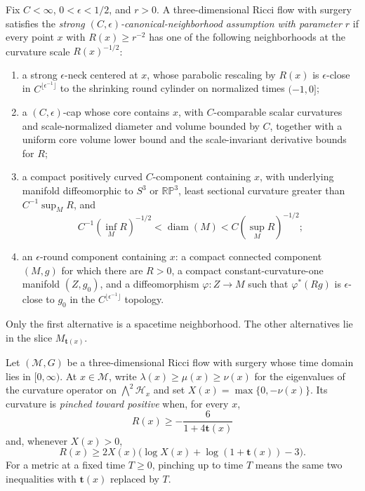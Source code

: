\begin{definition}
\label{def:strong-canonical-neighborhood-control}
\notready
Fix $C<\infty$, $0<\epsilon<1/2$, and $r>0$.  A three-dimensional Ricci
flow with surgery satisfies the \emph{strong
$(C,\epsilon)$-canonical-neighborhood assumption with parameter $r$} if
every point $x$ with $R(x)\ge r^{-2}$ has one of the following
neighborhoods at the curvature scale $R(x)^{-1/2}$:
\begin{enumerate}
\item a strong $\epsilon$-neck centered at $x$, whose parabolic rescaling by
      $R(x)$ is $\epsilon$-close in
      $C^{\lfloor\epsilon^{-1}\rfloor}$ to the shrinking round cylinder on
      normalized times $(-1,0]$;
\item a $(C,\epsilon)$-cap whose core contains $x$, with $C$-comparable
      scalar curvatures and scale-normalized diameter and volume bounded by
      $C$, together with a uniform core volume lower bound and the
      scale-invariant derivative bounds for $R$;
\item a compact positively curved $C$-component containing $x$, with
      underlying manifold diffeomorphic to $S^3$ or $\mathbb{RP}^3$,
      least sectional curvature greater than $C^{-1}\sup_M R$, and
      \[
       C^{-1}(\inf_M R)^{-1/2}<\operatorname{diam}(M)
       <C(\sup_M R)^{-1/2};
      \]
\item an $\epsilon$-round component containing $x$: a compact connected
      component $(M,g)$ for which there are $R>0$, a compact
      constant-curvature-one manifold $(Z,g_0)$, and a diffeomorphism
      $\varphi:Z\to M$ such that $\varphi^*(Rg)$ is $\epsilon$-close to $g_0$
      in the $C^{\lfloor\epsilon^{-1}\rfloor}$ topology.
\end{enumerate}
Only the first alternative is a spacetime neighborhood.  The other
alternatives lie in the slice $M_{\mathbf t(x)}$.
\end{definition}

\begin{definition}
\label{def:curvature-pinched-toward-positive}
\notready
Let $(\mathcal M,G)$ be a three-dimensional Ricci flow with surgery whose
time domain lies in $[0,\infty)$.  At $x\in\mathcal M$, write
$\lambda(x)\ge\mu(x)\ge\nu(x)$ for the eigenvalues of the curvature
operator on $\bigwedge^2\mathcal H_x$ and set
$X(x)=\max\{0,-\nu(x)\}$.  Its curvature is \emph{pinched toward positive}
when, for every $x$,
\[
 R(x)\ge-\frac{6}{1+4\mathbf t(x)}
\]
and, whenever $X(x)>0$,
\[
 R(x)\ge
 2X(x)\bigl(\log X(x)+\log(1+\mathbf t(x))-3\bigr).
\]
For a metric at a fixed time $T\ge0$, pinching up to time $T$ means the
same two inequalities with $\mathbf t(x)$ replaced by $T$.
\end{definition}

